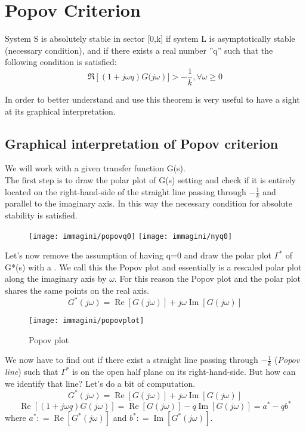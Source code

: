 \section{Popov Criterion}
\begin{thm} 
	System S is absolutely stable in sector [0,k] if system L is asymptotically stable (necessary condition), and if there exists a real number ''q'' such that the following condition is satisfied: 
	\[
	\Re\left[(1+j\omega q)G(j\omega\right)] > -\frac{1}{k}, \forall \omega \ge 0
	\]
\end{thm}
In order to better understand and use this theorem is very useful to have a sight at its graphical interpretation. 
\subsection{Graphical interpretation of Popov criterion}
We will work with a given transfer function G(s).\\  The first step is to draw the polar plot of G(s) setting  and check if it is entirely located on the right-hand-side of the straight line passing through $-\frac{1}{k}$ and parallel to the imaginary axis. In this way the necessary condition for absolute stability is satisfied.
\begin{figure}[H]
	\centering
	\texttt{[image: immagini/popovq0]} \qquad
	\texttt{[image: immagini/nyq0]}
	\label{fig:popovq0}
\end{figure}
Let's now remove the assumption of having q=0 and draw the polar plot $\Gamma^*$ of G*(s) with a . We call this the Popov plot and essentially is a rescaled polar plot along the imaginary axis by $\omega$. For this reason the Popov plot and the polar plot shares the same points on the real axis.
\[
G^*(j\omega)=\operatorname{Re}[G(j\omega)]+j\omega\operatorname{Im}[G(j\omega)]
\]
\begin{figure}[H]
	\centering
	\texttt{[image: immagini/popovplot]}
	\caption{Popov plot}
	\label{fig:popovplot}
\end{figure}
We now have to find out if there exist a straight line passing through $-\frac{1}{k}$ (\emph{Popov line}) such that $\Gamma^*$ is on the open half plane on its right-hand-side. But how can we identify that line? Let's do a bit of computation.
\[
G^*(j\omega)=\operatorname{Re}[G(j\omega)]+j\omega\operatorname{Im}[G(j\omega)]
\]
\[ \operatorname{Re}[(1+j\omega q)G(j\omega)]=\operatorname{Re}[G(j\omega)]-q\operatorname{Im}[G(j\omega)]=a^*-qb^*\] where $a^*\colon=\operatorname{Re}[G^*(j\omega)]$ and $b^*\colon=\operatorname{Im}[G^*(j\omega)]$.

